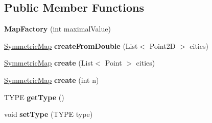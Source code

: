 \subsection*{Public Member Functions}
\begin{DoxyCompactItemize}
\item 
\hypertarget{classcom_1_1msu_1_1thief_1_1factory_1_1map_1_1MapFactory_a5c1488615b0e4591715fbb04f08f9f1e}{{\bfseries Map\-Factory} (int maximal\-Value)}\label{classcom_1_1msu_1_1thief_1_1factory_1_1map_1_1MapFactory_a5c1488615b0e4591715fbb04f08f9f1e}

\item 
\hypertarget{classcom_1_1msu_1_1thief_1_1factory_1_1map_1_1MapFactory_a49568f42b262a969c1e68b2210e6ca36}{\hyperlink{classcom_1_1msu_1_1thief_1_1model_1_1SymmetricMap}{Symmetric\-Map} {\bfseries create\-From\-Double} (List$<$ Point2\-D $>$ cities)}\label{classcom_1_1msu_1_1thief_1_1factory_1_1map_1_1MapFactory_a49568f42b262a969c1e68b2210e6ca36}

\item 
\hypertarget{classcom_1_1msu_1_1thief_1_1factory_1_1map_1_1MapFactory_aeef2c55f1b39b51f9f975d2d3dc5f35d}{\hyperlink{classcom_1_1msu_1_1thief_1_1model_1_1SymmetricMap}{Symmetric\-Map} {\bfseries create} (List$<$ Point $>$ cities)}\label{classcom_1_1msu_1_1thief_1_1factory_1_1map_1_1MapFactory_aeef2c55f1b39b51f9f975d2d3dc5f35d}

\item 
\hypertarget{classcom_1_1msu_1_1thief_1_1factory_1_1map_1_1MapFactory_a77012b17af6760dc740f4ed8d58f2e9b}{\hyperlink{classcom_1_1msu_1_1thief_1_1model_1_1SymmetricMap}{Symmetric\-Map} {\bfseries create} (int n)}\label{classcom_1_1msu_1_1thief_1_1factory_1_1map_1_1MapFactory_a77012b17af6760dc740f4ed8d58f2e9b}

\item 
\hypertarget{classcom_1_1msu_1_1thief_1_1factory_1_1map_1_1MapFactory_a15e3c92a133fad8a8905dc6782404f65}{T\-Y\-P\-E {\bfseries get\-Type} ()}\label{classcom_1_1msu_1_1thief_1_1factory_1_1map_1_1MapFactory_a15e3c92a133fad8a8905dc6782404f65}

\item 
\hypertarget{classcom_1_1msu_1_1thief_1_1factory_1_1map_1_1MapFactory_abf65e43f6ef59a0c0cb79a1f72546049}{void {\bfseries set\-Type} (T\-Y\-P\-E type)}\label{classcom_1_1msu_1_1thief_1_1factory_1_1map_1_1MapFactory_abf65e43f6ef59a0c0cb79a1f72546049}

\end{DoxyCompactItemize}
